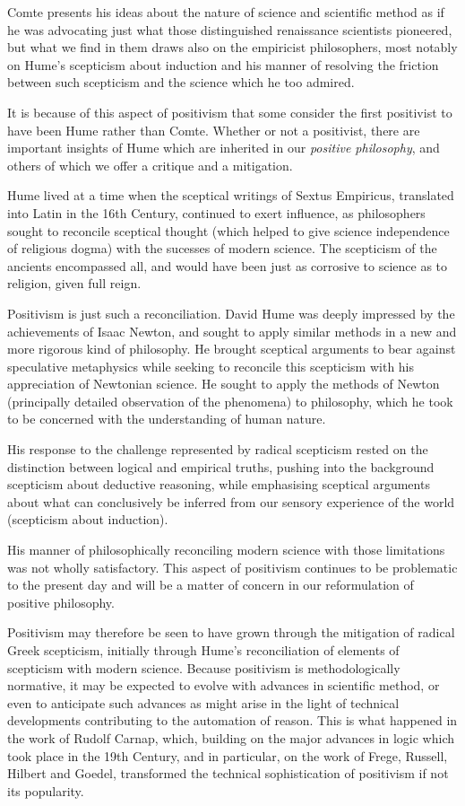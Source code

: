 Comte presents his ideas about the nature of science and scientific method as if he was advocating just what those distinguished renaissance scientists pioneered, but what we find in them draws also on the empiricist philosophers, most notably on Hume's scepticism about induction and his manner of resolving the friction between such scepticism and the science which he too admired.

It is because of this aspect of positivism that some consider the first positivist to have been Hume rather than Comte.
Whether or not a positivist, there are important insights of Hume which are inherited in our {\it positive philosophy}, and others of which we offer a critique and a mitigation.

Hume lived at a time when the sceptical writings of Sextus Empiricus, translated into Latin in the 16th Century, continued to exert influence, as philosophers sought to reconcile sceptical thought (which helped to give science independence of religious dogma) with the sucesses of modern science.
The scepticism of the ancients encompassed all, and would have been just as corrosive to science as to religion, given full reign.

Positivism is just such a reconciliation.
David Hume was deeply impressed by the achievements of Isaac Newton, and sought to apply similar methods in a new and more rigorous kind of philosophy.
He brought sceptical arguments to bear against speculative metaphysics while seeking to reconcile this scepticism with his appreciation of Newtonian science.
He sought to apply the methods of Newton (principally detailed observation of the phenomena) to philosophy, which he took to be concerned with the understanding of human nature.

His response to the challenge represented by radical scepticism rested on the distinction between logical and empirical truths, pushing into the background scepticism about deductive reasoning, while emphasising sceptical
arguments about what can conclusively be inferred from our sensory experience of the world (scepticism about induction).

His manner of philosophically reconciling modern science with those limitations was not wholly satisfactory.
This aspect of positivism continues to be problematic to the present day and will be
a matter of concern in our reformulation of positive philosophy.

Positivism may therefore be seen to have grown through the mitigation of radical
Greek scepticism, initially through Hume's reconciliation of elements of scepticism
with modern science.
Because positivism is methodologically normative, it may be expected to evolve with advances in scientific method, or even to anticipate such advances as might arise in the light of technical developments contributing to the automation of reason.
This is what happened in the work of Rudolf Carnap, which, building on the major advances in logic which took place in the 19th Century, and in particular, on the work of Frege, Russell, Hilbert and Goedel, transformed the technical sophistication of positivism if not its popularity.


